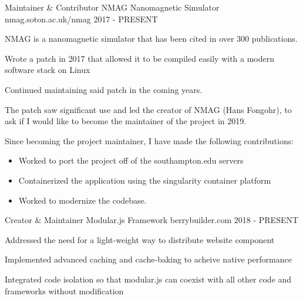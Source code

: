 


\begin{cventries}


\cventry
{Maintainer \& Contributor} %
{NMAG Nanomagnetic Simulator} %
{nmag.soton.ac.uk/nmag} %
{2017 - PRESENT} %
{ %
\begin{cvitems}
\item {NMAG is a nanomagnetic simulator that has been cited in over 300 publications.}
\item {Wrote a patch in 2017 that allowed it to be compiled easily with a modern software stack on Linux}
\item {Continued maintaining said patch in the coming years.}
\item {The patch saw significant use and led the creator of NMAG (Hans Fongohr), to ask if I would like to become the maintainer of the project in 2019.}
\item {Since becoming the project maintainer, I have made the following contributions:}
\begin {itemize}
\item {Worked to port the project off of the southampton.edu servers}
\item {Containerized the application using the singularity container platform}
\item {Worked to modernize the codebase.}
\end{itemize}
\end{cvitems}
}


\cventry
{Creator \& Maintainer} %
{Modular.js Framework} %
{berrybuilder.com} %
{2018 - PRESENT} %
{ %
\begin{cvitems}
\item {Addressed the need for a light-weight way to distribute website component}
\item {Implemented advanced caching and cache-baking to acheive native performance}
\item {Integrated code isolation so that modular.js can coexist with all other code and frameworks without modification}
\end{cvitems}
}


\end{cventries}
